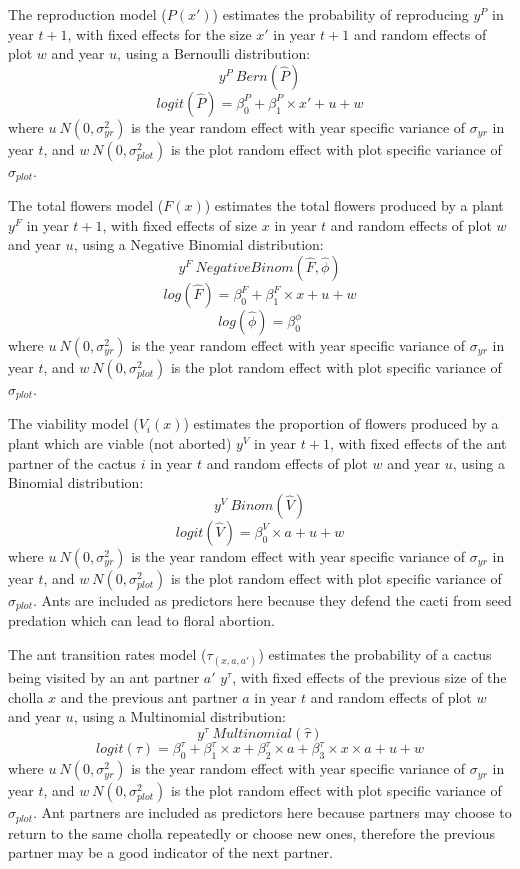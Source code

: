 \documentclass[11pt]{article}
\begin{document}
The reproduction model ($P(x')$) estimates the probability of reproducing $y^P$ in year $t+1$, with fixed effects for the size $x'$ in year $t+1$ and random effects of plot $w$ and year $u$, using a Bernoulli distribution:
$$y^P ~ Bern(\hat{P})$$
$$logit(\hat{P}) = \beta_{0}^{P} + \beta_{1}^{P} \times x' + u + w$$
where $u ~ N(0,\sigma_{yr}^{2})$ is the year random effect with year specific variance of $\sigma_{yr}$ in year $t$, and $w ~ N(0,\sigma_{plot}^{2})$ is the plot random effect with plot specific variance of $\sigma_{plot}$.

The total flowers model ($F(x)$) estimates the total flowers produced by a plant $y^F$ in year $t+1$, with fixed effects of size $x$ in year $t$ and random effects of plot $w$ and year $u$, using a Negative Binomial distribution:
$$y^{F} ~ Negative Binom(\hat{F},\hat{\phi})$$
$$log(\hat{F}) = \beta_{0}^{F} + \beta_{1}^{F} \times x + u + w$$
$$log(\hat{\phi}) = \beta_{0}^{\phi}$$
where $u ~ N(0,\sigma_{yr}^{2})$ is the year random effect with year specific variance of $\sigma_{yr}$ in year $t$, and $w ~ N(0,\sigma_{plot}^{2})$ is the plot random effect with plot specific variance of $\sigma_{plot}$.

The viability model ($V_i(x)$) estimates the proportion of flowers produced by a plant which are viable (not aborted) $y^V$ in year $t+1$, with fixed effects of the ant partner of the cactus $i$ in year $t$ and random effects of plot $w$ and year $u$, using a Binomial distribution:
$$y^{V} ~ Binom(\hat{V})$$
$$logit(\hat{V}) = \beta_{0}^{V} \times a + u + w$$
where $u ~ N(0,\sigma_{yr}^{2})$ is the year random effect with year specific variance of $\sigma_{yr}$ in year $t$, and $w ~ N(0,\sigma_{plot}^{2})$ is the plot random effect with plot specific variance of $\sigma_{plot}$.
Ants are included as predictors here because they defend the cacti from seed predation which can lead to floral abortion. 

The ant transition rates model ($\tau_(x,a,a')$) estimates the probability of a cactus being visited by an ant partner $a'$ $y^{\tau}$, with fixed effects of the previous size of the cholla $x$  and the previous ant partner $a$  in year $t$ and random effects of plot $w$ and year $u$, using a Multinomial distribution: 
$$y^{\tau} ~ Multinomial(\hat{\tau})$$
$$logit(\tau) = \beta_{0}^{\tau} + \beta_{1}^{\tau} \times x + \beta_{2}^{\tau} \times a + \beta_{3}^{\tau} \times x \times a + u + w$$
where $u ~ N(0,\sigma_{yr}^{2})$ is the year random effect with year specific variance of $\sigma_{yr}$ in year $t$, and $w ~ N(0,\sigma_{plot}^{2})$ is the plot random effect with plot specific variance of $\sigma_{plot}$.
Ant partners are included as predictors here because partners may choose to return to the same cholla repeatedly or choose new ones, therefore the previous partner may be a good indicator of the next partner. 
\end{document}
